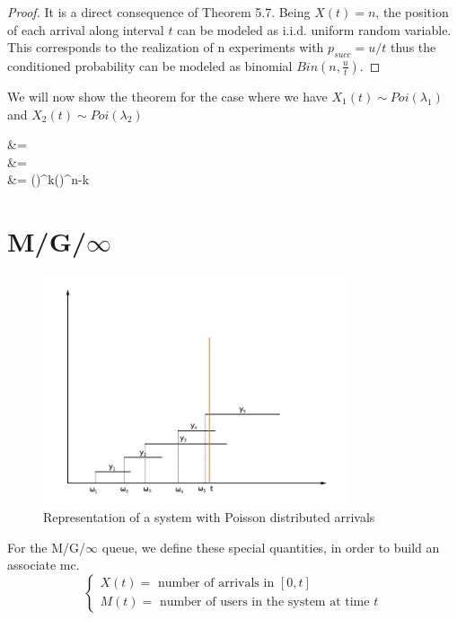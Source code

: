 \begin{proof}
	It is a direct consequence of Theorem 5.7.
	Being $X(t)=n$, the position of each arrival along interval $t$ can be modeled as i.i.d. uniform random variable. This corresponds to the realization of n experiments with $p_{succ}=u/t$ thus the conditioned probability can be modeled as binomial $Bin(n,\frac{u}{t})$.
\end{proof}

We will now show the theorem for the case where we have $X_1(t)\sim Poi(\lambda_1)$ and $X_2(t)\sim Poi(\lambda_2)$
\begin{esp}
	\prob[X_1(t)=k |X_1(t)+X_2(t)=n] &= \frac{\prob[X_1(t)=k |X_1(t)=k,X_2(t)=n-k]}{\prob[X_1(t)+X_2(t)=n]}\\
	&=  \\
	&=  \cdot \left(\right)^{k}\cdot \left(\right)^{n-k}
\end{esp}

\section{M/G/$\infty$}

\begin{figure}[h]
	\centering
	\includegraphics[width=0.8\textwidth]{img/mginf}
	\caption{Representation of a system with Poisson distributed arrivals}
\end{figure}

For the M/G/$\infty$ queue, we define these special quantities, in order to build an associate \gls{mc}.
\begin{equation*}
	\begin{cases}
		X(t) = \text{ number of arrivals in }[ 0, t ] \\
		M(t) = \text{ number of users in the system at time }t
	\end{cases}
\end{equation*}

